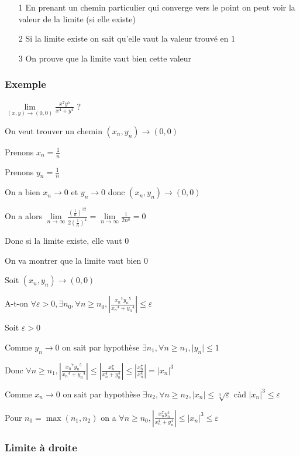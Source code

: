 \documentclass[a4paper,10pt]{article}
\newcommand{\ap}{\rightarrow}
\newcommand{\abs}[1]{\left\vert #1 \right\vert}
\newcommand{\clim}[1]{\lim\limits_{#1}}
\begin{document}
\begin{itemize}
	\item[1]{En prenant un chemin particulier qui converge vers le point on peut voir la valeur de la limite (si elle existe)}
	\item[2]{Si la limite existe on sait qu'elle vaut la valeur trouvé en $1$}
        \item[3]{On prouve que la limite vaut bien cette valeur}	
\end{itemize}

\newpage

\subsubsection{Exemple}

$\clim{(x,y) \ap (0,0)} \frac{x^7 y^5}{x^4+y^4}$ ?

On veut trouver un chemin $(x_n,y_n) \ap (0,0)$

Prenons $x_n = \frac{1}{n}$

Prenons $y_n = \frac{1}{n}$

On a bien $x_n \ap 0$ et $y_n \ap 0$ donc $(x_n,y_n) \ap (0,0)$

On a alors $\clim{n \ap \infty} \frac{ (\frac{1}{n})^{12} }{2 (\frac{1}{n})^4 } = \clim{n \ap \infty} \frac{1}{2 n^8} = 0$

Donc si la limite existe, elle vaut $0$

On va montrer que la limite vaut bien $0$

Soit $(x_n,y_n) \ap (0,0)$

A-t-on $\forall \varepsilon > 0, \exists n_0, \forall n \geq n_0, \abs{ \frac{{x_n}^7 {y_n}^5}{{x_n}^4 + {y_n}^4}} \leq \varepsilon$

Soit $\varepsilon > 0$

Comme $y_n \ap 0$ on sait par hypothèse $\exists n_1, \forall n \geq n_1, \vert y_n \vert \leq 1$

Donc $\forall n \geq n_1 , \abs{ \frac{ {x_n}^7 {y_n}^5  }{ {x_n}^4 + {y_n}^4 } } \leq \abs{ \frac{x_n^7}{x_n^4 + y_n^4}} \leq \abs{ \frac{x_n^7}{x_n^4}} = \abs{x_n}^3$

Comme $x_n \ap 0$ on sait par hypothèse $\exists n_2, \forall n \geq n_2, \vert x_n \vert \leq \sqrt[3]{\varepsilon}$ càd ${\vert x_n \vert}^3 \leq \varepsilon$

Pour $n_0 = \max(n_1,n_2)$ on a $\forall n \geq n_0, \abs{ \frac{x_n^7 y_n^5}{x_n^4 + y_n^4 } } \leq {\vert x_n \vert}^3 \leq \varepsilon$ 
\subsubsection{Limite à droite}
\end{document}
